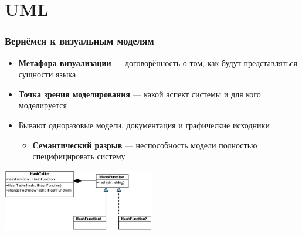 \documentclass{../../slides-style}
\begin{document}
    \section{UML}

    \begin{frame}
        \frametitle{Вернёмся к визуальным моделям}
        \begin{itemize}
            \item \textbf{Метафора визуализации} --- договорённость о том, как будут представляться сущности языка
            \item \textbf{Точка зрения моделирования} --- какой аспект системы и для кого моделируется
            \item Бывают одноразовые модели, документация и графические исходники
            \begin{itemize}
                \item \textbf{Семантический разрыв} --- неспособность модели полностью специфицировать систему
            \end{itemize}
        \end{itemize}
        \begin{center}
            \includegraphics[width=0.5\textwidth]{hashTable.png}
        \end{center}
    \end{frame}
\end{document}
